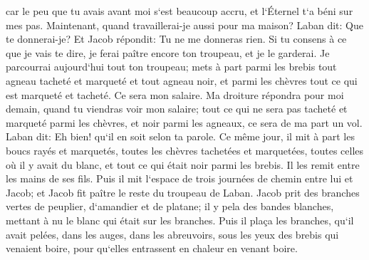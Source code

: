 \verse car le peu que tu avais avant moi s`est beaucoup accru, et l`Éternel t`a béni sur mes pas. Maintenant, quand travaillerai-je aussi pour ma maison? 
\verse Laban dit: Que te donnerai-je? Et Jacob répondit: Tu ne me donneras rien. Si tu consens à ce que je vais te dire, je ferai paître encore ton troupeau, et je le garderai. 
\verse Je parcourrai aujourd`hui tout ton troupeau; mets à part parmi les brebis tout agneau tacheté et marqueté et tout agneau noir, et parmi les chèvres tout ce qui est marqueté et tacheté. Ce sera mon salaire. 
\verse Ma droiture répondra pour moi demain, quand tu viendras voir mon salaire; tout ce qui ne sera pas tacheté et marqueté parmi les chèvres, et noir parmi les agneaux, ce sera de ma part un vol. 
\verse Laban dit: Eh bien! qu`il en soit selon ta parole. 
\verse Ce même jour, il mit à part les boucs rayés et marquetés, toutes les chèvres tachetées et marquetées, toutes celles où il y avait du blanc, et tout ce qui était noir parmi les brebis. Il les remit entre les mains de ses fils. 
\verse Puis il mit l`espace de trois journées de chemin entre lui et Jacob; et Jacob fit paître le reste du troupeau de Laban. 
\verse Jacob prit des branches vertes de peuplier, d`amandier et de platane; il y pela des bandes blanches, mettant à nu le blanc qui était sur les branches. 
\verse Puis il plaça les branches, qu`il avait pelées, dans les auges, dans les abreuvoirs, sous les yeux des brebis qui venaient boire, pour qu`elles entrassent en chaleur en venant boire. 
